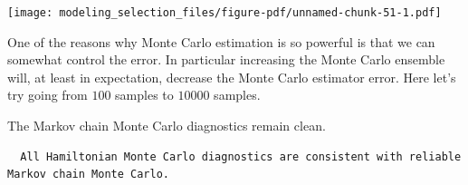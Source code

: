\documentclass[
  letterpaper,
  DIV=11,
  numbers=noendperiod]{scrartcl}
\newenvironment{Shaded}{\begin{snugshade}}{\end{snugshade}}
\newcommand{\AttributeTok}[1]{\textcolor[rgb]{0.40,0.45,0.13}{#1}}
\newcommand{\DecValTok}[1]{\textcolor[rgb]{0.68,0.00,0.00}{#1}}
\newcommand{\FunctionTok}[1]{\textcolor[rgb]{0.28,0.35,0.67}{#1}}
\newcommand{\NormalTok}[1]{\textcolor[rgb]{0.00,0.23,0.31}{#1}}
\newcommand{\OtherTok}[1]{\textcolor[rgb]{0.00,0.23,0.31}{#1}}
\newcommand{\SpecialCharTok}[1]{\textcolor[rgb]{0.37,0.37,0.37}{#1}}
\newcommand{\StringTok}[1]{\textcolor[rgb]{0.13,0.47,0.30}{#1}}
\begin{document}
\texttt{[image: modeling\_selection\_files/figure-pdf/unnamed-chunk-51-1.pdf]}

One of the reasons why Monte Carlo estimation is so powerful is that we
can somewhat control the error. In particular increasing the Monte Carlo
ensemble will, at least in expectation, decrease the Monte Carlo
estimator error. Here let's try going from \(100\) samples to \(10000\)
samples.

\begin{Shaded}
\end{Shaded}

The Markov chain Monte Carlo diagnostics remain clean.

\begin{Shaded}
\end{Shaded}

\begin{verbatim}
  All Hamiltonian Monte Carlo diagnostics are consistent with reliable
Markov chain Monte Carlo.
\end{verbatim}

\begin{Shaded}
\end{Shaded}
\end{document}
